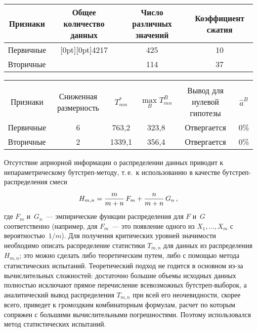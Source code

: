 \begin{multicols}{2}
\begin{table*}\small %
\begin{center}
\vspace*{2ex}

\begin{tabular}{|l|c|c|c|}
\hline
\multicolumn{1}{|c|}{Признаки}&Общее количество данных&Число различных значений&Коэффициент сжатия\\
\hline
Первичные&\multicolumn{1}{c|}{\raisebox{-6pt}[0pt][0pt]{4217}}&425&10\\
Вторичные&&114&37\\
\hline
\end{tabular}
\end{center}
\vspace*{-3pt}
\end{table*}

\begin{table*}[b]\small %
\vspace*{-9pt}
\begin{center}
\vspace*{2ex}

\begin{tabular}{|l|c|c|c|c|c|}
\hline
&&&&&\\[-9pt]
\multicolumn{1}{|c|}{Признаки}&Сниженная размерность&$T^*_{mn}$&$\max\limits_B T^B_{mn}$&Вывод для нулевой 
гипотезы&$\hat{a}^B$\\
\hline
Первичные &6&\hphantom{9}763,2&323,8&Отвергается&0\%\\
Вторичные &2&1339,1&356,4&Отвергается&0\%\\
\hline
\end{tabular}
\end{center}
\end{table*}


      Отсутствие априорной информации о распределении данных приводит к 
непараметрическому бут\-стреп-ме\-то\-ду, т.\,е.\ к использованию в качестве 
      бут\-стреп-рас\-пре\-де\-ле\-ния смеси 
      $$H_{m,n}=\fr{m}{m+n}\,F_m\hm+\fr{n}{m+n}\,G_n\,,
      $$
      где $F_m$ и~$G_n$~--- эмпирические функции 
распределения для $F$ и~$G$ соответственно (например, для $F_m$~--- это появление одного из 
$X_1,\ldots ,X_m$ с вероятностью~$1/m$). Для получения критических уровней значимости 
необходимо описать распределение статистики $T_{m,n}$ для данных из распределения 
$H_{m,n}$; это можно сделать либо теоретическим путем, либо с помощью метода 
статистических испытаний. Теоретический подход не годится в основном из-за 
вычислительных сложностей: достаточно большие объемы исходных данных полностью 
исключают прямое перечисление всевозможных бут\-стреп-вы\-бо\-рок, а аналитический 
вывод распределения $T_{m,n}$ при всей его неочевидности, скорее всего, приведет к 
громоздким комбинаторным формулам, расчет по которым сопряжен с большими 
вычислительными погрешностями. Поэтому использовался метод статистических 
испытаний.
      

\end{multicols}
